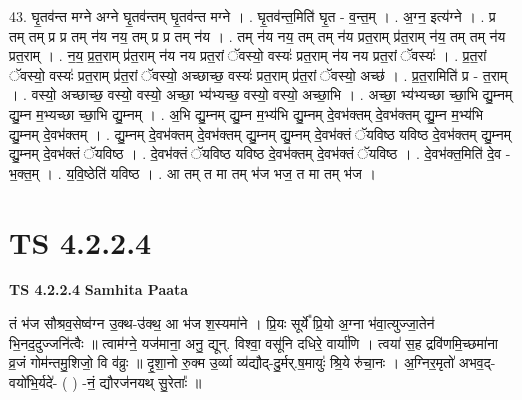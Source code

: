 \documentclass[17pt]{extarticle}
\begin{document}
43. घृ॒तव॑न्त मग्ने अग्ने घृ॒तव॑न्तम् घृ॒तव॑न्त मग्ने । . घृ॒तव॑न्त॒मिति॑ घृ॒त - व॒न्त॒म् । . अ॒ग्न॒ इत्य॑ग्ने । . प्र तम् तम् प्र प्र तम् न॑य नय॒ तम् प्र प्र तम् न॑य । . तम् न॑य नय॒ तम् तम् न॑य प्रत॒राम् प्र॑त॒राम् न॑य॒ तम् तम् न॑य प्रत॒राम् । . न॒य॒ प्र॒त॒राम् प्र॑त॒राम् न॑य नय प्रत॒रां ॅवस्यो॒ वस्यः॑ प्रत॒राम् न॑य नय प्रत॒रां ॅवस्यः॑ । . प्र॒त॒रां ॅवस्यो॒ वस्यः॑ प्रत॒राम् प्र॑त॒रां ॅवस्यो॒ अच्छाच्छ॒ वस्यः॑ प्रत॒राम् प्र॑त॒रां ॅवस्यो॒ अच्छ॑ । . प्र॒त॒रामिति॑ प्र - त॒राम् । . वस्यो॒ अच्छाच्छ॒ वस्यो॒ वस्यो॒ अच्छा॒ भ्य॑भ्यच्छ॒ वस्यो॒ वस्यो॒ अच्छा॒भि । . अच्छा॒ भ्य॑भ्यच्छा च्छा॒भि द्यु॒म्नम् द्यु॒म्न म॒भ्यच्छा च्छा॒भि द्यु॒म्नम् । . अ॒भि द्यु॒म्नम् द्यु॒म्न म॒भ्य॑भि द्यु॒म्नम् दे॒वभ॑क्तम् दे॒वभ॑क्तम् द्यु॒म्न म॒भ्य॑भि द्यु॒म्नम् दे॒वभ॑क्तम् । . द्यु॒म्नम् दे॒वभ॑क्तम् दे॒वभ॑क्तम् द्यु॒म्नम् द्यु॒म्नम् दे॒वभ॑क्तं ॅयविष्ठ यविष्ठ दे॒वभ॑क्तम् द्यु॒म्नम् द्यु॒म्नम् दे॒वभ॑क्तं ॅयविष्ठ । . दे॒वभ॑क्तं ॅयविष्ठ यविष्ठ दे॒वभ॑क्तम् दे॒वभ॑क्तं ॅयविष्ठ । . दे॒वभ॑क्त॒मिति॑ दे॒व - भ॒क्त॒म् । . य॒वि॒ष्ठेति॑ यविष्ठ । . आ तम् त मा तम् भ॑ज भज॒ त मा तम् भ॑ज । \newline
\pagebreak
{}

\section{ TS 4.2.2.4 }

\textbf{TS 4.2.2.4 } \newline
\textbf{Samhita Paata} \newline

तं भ॑ज सौश्रव॒सेष्व॑ग्न उ॒क्थ-उ॑क्थ॒ आ भ॑ज श॒स्यमा॑ने । प्रि॒यः सूर्ये᳚ प्रि॒यो अ॒ग्ना भ॑वा॒त्युज्जा॒तेन॑ भि॒नद॒दुज्जनि॑त्वैः ॥ त्वाम॑ग्ने॒ यज॑माना॒ अनु॒ द्यून्. विश्वा॒ वसू॑नि दधिरे॒ वार्या॑णि । त्वया॑ स॒ह द्रवि॑णमि॒च्छमा॑ना व्र॒जं गोम॑न्तमु॒शिजो॒ वि व॑व्रुः ॥ दृ॒शा॒नो रु॒क्म उ॒र्व्या व्य॑द्यौद्-दु॒र्मर्.ष॒मायुः॑ श्रि॒ये रु॑चा॒नः । अ॒ग्निर॒मृतो॑ अभव॒द्-वयो॑भि॒र्यदे॑- ( ) -नं॒ द्यौरज॑नयथ् सु॒रेताः᳚ ॥ \newline
\end{document}
